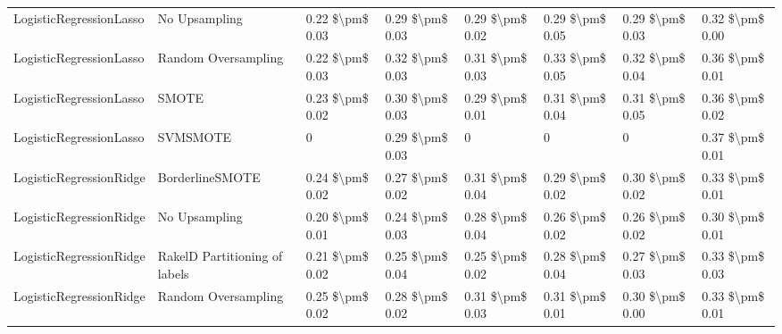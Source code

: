 \begin{tabular}{llllllll}
        LogisticRegressionLasso &                 No Upsampling & 0.22 \$\textbackslash pm\$ 0.03 &           0.29 \$\textbackslash pm\$ 0.03 &       0.29 \$\textbackslash pm\$ 0.02 &        0.29 \$\textbackslash pm\$ 0.05 &                         0.29 \$\textbackslash pm\$ 0.03 &     0.32 \$\textbackslash pm\$ 0.00 \\
        LogisticRegressionLasso &           Random Oversampling & 0.22 \$\textbackslash pm\$ 0.03 &           0.32 \$\textbackslash pm\$ 0.03 &       0.31 \$\textbackslash pm\$ 0.03 &        0.33 \$\textbackslash pm\$ 0.05 &                         0.32 \$\textbackslash pm\$ 0.04 &     0.36 \$\textbackslash pm\$ 0.01 \\
        LogisticRegressionLasso &                         SMOTE & 0.23 \$\textbackslash pm\$ 0.02 &           0.30 \$\textbackslash pm\$ 0.03 &       0.29 \$\textbackslash pm\$ 0.01 &        0.31 \$\textbackslash pm\$ 0.04 &                         0.31 \$\textbackslash pm\$ 0.05 &     0.36 \$\textbackslash pm\$ 0.02 \\
        LogisticRegressionLasso &                      SVMSMOTE &               0 &           0.29 \$\textbackslash pm\$ 0.03 &                     0 &                      0 &                                       0 &     0.37 \$\textbackslash pm\$ 0.01 \\
        LogisticRegressionRidge &               BorderlineSMOTE & 0.24 \$\textbackslash pm\$ 0.02 &           0.27 \$\textbackslash pm\$ 0.02 &       0.31 \$\textbackslash pm\$ 0.04 &        0.29 \$\textbackslash pm\$ 0.02 &                         0.30 \$\textbackslash pm\$ 0.02 &     0.33 \$\textbackslash pm\$ 0.01 \\
        LogisticRegressionRidge &                 No Upsampling & 0.20 \$\textbackslash pm\$ 0.01 &           0.24 \$\textbackslash pm\$ 0.03 &       0.28 \$\textbackslash pm\$ 0.04 &        0.26 \$\textbackslash pm\$ 0.02 &                         0.26 \$\textbackslash pm\$ 0.02 &     0.30 \$\textbackslash pm\$ 0.01 \\
        LogisticRegressionRidge & RakelD Partitioning of labels & 0.21 \$\textbackslash pm\$ 0.02 &           0.25 \$\textbackslash pm\$ 0.04 &       0.25 \$\textbackslash pm\$ 0.02 &        0.28 \$\textbackslash pm\$ 0.04 &                         0.27 \$\textbackslash pm\$ 0.03 &     0.33 \$\textbackslash pm\$ 0.03 \\
        LogisticRegressionRidge &           Random Oversampling & 0.25 \$\textbackslash pm\$ 0.02 &           0.28 \$\textbackslash pm\$ 0.02 &       0.31 \$\textbackslash pm\$ 0.03 &        0.31 \$\textbackslash pm\$ 0.01 &                         0.30 \$\textbackslash pm\$ 0.00 &     0.33 \$\textbackslash pm\$ 0.01 \\

\end{tabular}
